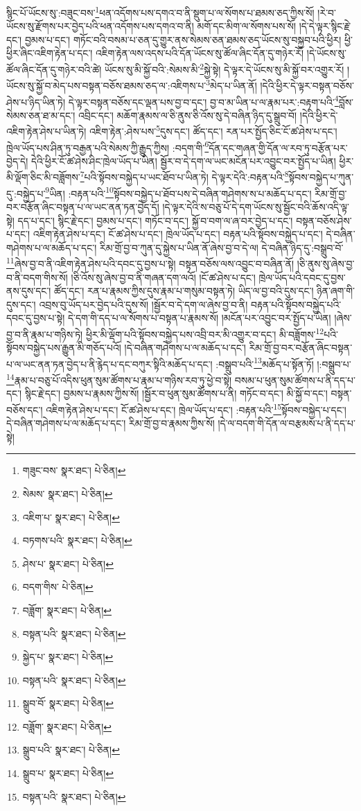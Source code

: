 སྙིང་པོ་ཡོངས་སུ་:བཟུང་བས་\footnote{གཟུང་བས་  སྣར་ཐང་།  པེ་ཅིན། }ཕན་འདོགས་པས་དགའ་བ་ནི་སྡུག་པ་ལ་སོགས་པ་ཐམས་ཅད་ཀྱིས་སོ། །རེ་བ་ཡོངས་སུ་རྫོགས་པར་བྱེད་པའི་ཕན་འདོགས་པས་དགའ་བ་ནི། མགོ་དང་མིག་ལ་སོགས་པས་སོ། །དེ་དེ་ལྟར་སྙིང་རྗེ་དང་། བྱམས་པ་དང་། གཏོང་བའི་བསམ་པ་ཅན་དུ་གྱུར་ནས་སེམས་ཅན་ཐམས་ཅད་ཡོངས་སུ་བསྐྱབ་པའི་ཕྱིར། ཕྱི་ཕྱིར་ཞིང་འཇིག་རྟེན་པ་དང་། འཇིག་རྟེན་ལས་འདས་པའི་དོན་ཡོངས་སུ་ཚོལ་ཞིང་དོན་དུ་གཉེར་རོ། །དེ་ཡོངས་སུ་ཚོལ་ཞིང་དོན་དུ་གཉེར་བའི་ཚེ། ཡོངས་སུ་མི་སྐྱོ་བའི་:སེམས་མི་\footnote{སེམས་  སྣར་ཐང་།  པེ་ཅིན། }སྐྱེ་སྟེ། དེ་ལྟར་དེ་ཡོངས་སུ་མི་སྐྱོ་བར་འགྱུར་རོ། །ཡོངས་སུ་སྐྱོ་བ་མེད་པས་བསྟན་བཅོས་ཐམས་ཅད་ལ་:འཇིགས་པ་\footnote{འཇིག་པ་  སྣར་ཐང་།  པེ་ཅིན། }མེད་པ་ཡིན་ནོ། །དེའི་ཕྱིར་དེ་ལྟར་བསྟན་བཅོས་ཤེས་པ་ཉིད་ཡིན་ཏེ། དེ་ལྟར་བསྟན་བཅོས་དང་ལྡན་པས་བྱ་བ་དང་། བྱ་བ་མ་ཡིན་པ་ལ་རྣམ་པར་:བརྟག་པའི་\footnote{བཏགས་པའི་  སྣར་ཐང་།  པེ་ཅིན། }བློས་སེམས་ཅན་ཐ་མ་དང་། འབྲིང་དང་། མཆོག་རྣམས་ལ་ཅི་ནུས་ཅི་འོས་སུ་དེ་བཞིན་ཉིད་དུ་སྒྲུབ་བོ། །དེའི་ཕྱིར་དེ་འཇིག་རྟེན་ཤེས་པ་ཡིན་ཏེ། འཇིག་རྟེན་:ཤེས་པས་\footnote{ཤེས་པ་  སྣར་ཐང་།  པེ་ཅིན། }དུས་དང་། ཚོད་དང་། རན་པར་སྤྱོད་ཅིང་ངོ་ཚ་ཤེས་པ་དང་། ཁྲེལ་ཡོད་པས་ཤིན་ཏུ་བརྒྱན་པའི་སེམས་ཀྱི་རྒྱུད་ཀྱིས། :བདག་གི་\footnote{བདག་གིས་  པེ་ཅིན། }དོན་དང་གཞན་གྱི་དོན་ལ་རབ་ཏུ་བརྩོན་པར་བྱེད་དེ། དེའི་ཕྱིར་ངོ་ཚ་ཤེས་ཤིང་ཁྲེལ་ཡོད་པ་ཡིན། སྦྱོར་བ་དེ་དག་ལ་ཡང་མངོན་པར་འབྱུང་བར་སྤྱོད་པ་ཡིན། ཕྱིར་མི་ལྡོག་ཅིང་མི་བཟློགས་\footnote{བཟློག་  སྣར་ཐང་།  པེ་ཅིན། }པའི་སྟོབས་བསྐྱེད་པ་ཡང་ཐོབ་པ་ཡིན་ཏེ། དེ་ལྟར་དེའི་:བརྟན་པའི་\footnote{བསྟན་པའི་  སྣར་ཐང་།  པེ་ཅིན། }སྟོབས་བསྐྱེད་པ་ཀུན་དུ་:བསྐྱེད་པ་\footnote{སྐྱེད་པ་  སྣར་ཐང་།  པེ་ཅིན། }ཡིན། :བརྟན་པའི་\footnote{བསྟན་པའི་  སྣར་ཐང་།  པེ་ཅིན། }སྟོབས་བསྐྱེད་པ་ཐོབ་པས་དེ་བཞིན་གཤེགས་ས་པ་མཆོད་པ་དང་། རིམ་གྲོ་བྱ་བར་བརྩོན་ཞིང་བསྟན་པ་ལ་ཡང་ནན་ཏན་བྱེད་དོ། །དེ་ལྟར་དེའི་ས་བཅུ་པོ་དེ་དག་ཡོངས་སུ་སྦྱོང་བའི་ཆོས་འདི་ལྟ་སྟེ། དད་པ་དང་། སྙིང་རྗེ་དང་། བྱམས་པ་དང་། གཏོང་བ་དང་། སྐྱོ་བ་བག་ལ་ཞ་བར་བྱེད་པ་དང་། བསྟན་བཅོས་ཤེས་པ་དང་། འཇིག་རྟེན་ཤེས་པ་དང་། ངོ་ཚ་ཤེས་པ་དང་། ཁྲེལ་ཡོད་པ་དང་། བརྟན་པའི་སྟོབས་བསྐྱེད་པ་དང་། དེ་བཞིན་གཤེགས་པ་ལ་མཆོད་པ་དང་། རིམ་གྲོ་བྱ་བ་ཀུན་དུ་སྐྱེས་པ་ཡིན་ནོ་ཞེས་བྱ་བ་དེ་ལ། དེ་བཞིན་ཉིད་དུ་:བསྒྲུབ་བོ་\footnote{སྒྲུབ་བོ་  སྣར་ཐང་།  པེ་ཅིན། }ཞེས་བྱ་བ་ནི་འཇིག་རྟེན་ཤེས་པའི་དབང་དུ་བྱས་པ་སྟེ། བསྟན་བཅོས་ལས་འབྱུང་བ་བཞིན་ནོ། །ཅི་ནུས་སུ་ཞེས་བྱ་བ་ནི་བདག་གིས་སོ། །ཅི་འོས་སུ་ཞེས་བྱ་བ་ནི་གཞན་དག་ལའོ། །ངོ་ཚ་ཤེས་པ་དང་། ཁྲེལ་ཡོད་པའི་དབང་དུ་བྱས་ནས་དུས་དང་། ཚོད་དང་། རན་པ་རྣམས་ཀྱིས་དུས་རྣམ་པ་གསུམ་བསྟན་ཏེ། ཡིད་ལ་བྱ་བའི་དུས་དང་། ཉིན་ཞག་གི་དུས་དང་། འབྲས་བུ་ཡོད་པར་བྱེད་པའི་དུས་སོ། །སྦྱོར་བ་དེ་དག་ལ་ཞེས་བྱ་བ་ནི། བརྟན་པའི་སྟོབས་བསྐྱེད་པའི་དབང་དུ་བྱས་པ་སྟེ། དེ་དག་གི་དད་པ་ལ་སོགས་པ་བསྟན་པ་རྣམས་སོ། །མངོན་པར་འབྱུང་བར་སྤྱོད་པ་ཡིན། །ཞེས་བྱ་བ་ནི་རྣམ་པ་གཉིས་ཏེ། ཕྱིར་མི་ལྡོག་པའི་སྟོབས་བསྐྱེད་པས་འབྲི་བར་མི་འགྱུར་བ་དང་། མི་བཟློགས་\footnote{བཟློག་  སྣར་ཐང་།  པེ་ཅིན། }པའི་སྟོབས་བསྐྱེད་པས་རྒྱུན་མི་གཅོད་པའོ། །དེ་བཞིན་གཤེགས་པ་ལ་མཆོད་པ་དང་། རིམ་གྲོ་བྱ་བར་བརྩོན་ཞིང་བསྟན་པ་ལ་ཡང་ནན་ཏན་བྱེད་པ་ནི་རྙེད་པ་དང་བཀུར་སྟིའི་མཆོད་པ་དང་། :བསྒྲུབ་པའི་\footnote{སྒྲུབ་པའི་  སྣར་ཐང་།  པེ་ཅིན། }མཆོད་པ་སྟོན་ཏོ། །:བསྒྲུབ་པ་\footnote{སྒྲུབ་པ་  སྣར་ཐང་།  པེ་ཅིན། }རྣམ་པ་བཅུ་པོ་འདིས་ཕུན་སུམ་ཚོགས་པ་རྣམ་པ་གཉིས་རབ་ཏུ་ཕྱེ་བ་སྟེ། བསམ་པ་ཕུན་སུམ་ཚོགས་པ་ནི་དད་པ་དང་། སྙིང་རྗེ་དང་། བྱམས་པ་རྣམས་ཀྱིས་སོ། །སྦྱོར་བ་ཕུན་སུམ་ཚོགས་པ་ནི། གཏོང་བ་དང་། མི་སྐྱོ་བ་དང་། བསྟན་བཅོས་དང་། འཇིག་རྟེན་ཤེས་པ་དང་། ངོ་ཚ་ཤེས་པ་དང་། ཁྲེལ་ཡོད་པ་དང་། :བརྟན་པའི་\footnote{བསྟན་པའི་  སྣར་ཐང་།  པེ་ཅིན། }སྟོབས་བསྐྱེད་པ་དང་། དེ་བཞིན་གཤེགས་པ་ལ་མཆོད་པ་དང་། རིམ་གྲོ་བྱ་བ་རྣམས་ཀྱིས་སོ། །དེ་ལ་བདག་གི་དོན་ལ་བརྩམས་པ་ནི་དད་པ་སྟེ། 